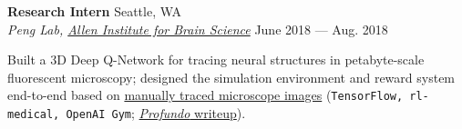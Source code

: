 \documentclass[a4paper,12pt]{article}
\newcommand{\ressubheading}[4]{{\begin{minipage}{\textwidth}
                                    \textbf{#1} \hfill #2 \\
                                    \textit{#3} \hfill #4 \\
\end{minipage}}}
\begin{document}

    \ressubheading{Research Intern}{Seattle, WA}{Peng Lab, \href{alleninstitute.org}{Allen Institute for Brain Science}}{June 2018 --- Aug. 2018}

    \vspace{-6pt} Built a 3D Deep Q-Network for tracing neural structures in petabyte-scale fluorescent microscopy; designed the simulation environment and reward system end-to-end based on \href{https://www.nature.com/articles/s41467-019-11443-y}{manually traced microscope images} (\texttt{TensorFlow, rl-medical, OpenAI Gym}; \href{https://www.ricardodecal.com/projects/profundo-an-rl-agent-for-neural-cell-tracing/}{\textit{Profundo} writeup}).\\

\end{document}
